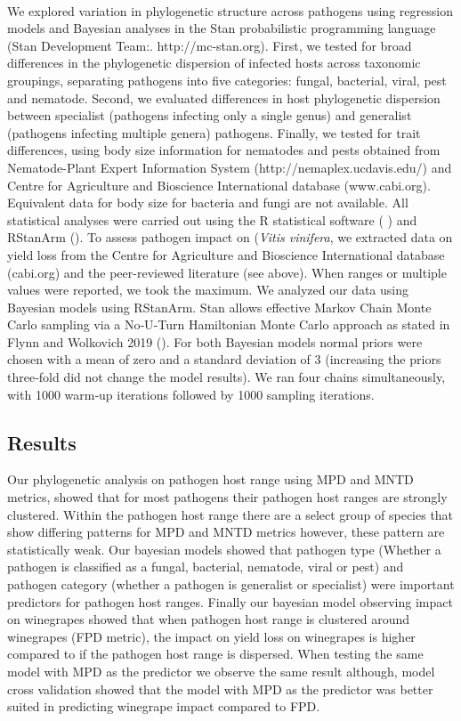 \documentclass{article}
\begin{document}
\paragraph{}We explored variation in phylogenetic structure across pathogens using regression models and Bayesian analyses in the Stan probabilistic programming language (Stan Development Team:. http://mc-stan.org). First, we tested for broad differences in the phylogenetic dispersion of infected hosts across taxonomic groupings, separating pathogens into five categories: fungal, bacterial, viral, pest and nematode. Second, we evaluated differences in host phylogenetic dispersion between specialist (pathogens infecting only a single genus) and generalist (pathogens infecting multiple genera) pathogens. Finally, we tested for trait differences, using body size information for nematodes and pests obtained from Nematode-Plant Expert Information System (http://nemaplex.ucdavis.edu/) and Centre for Agriculture and Bioscience International database (www.cabi.org). Equivalent data for body size for bacteria and fungi are not available. All statistical analyses were carried out using the R statistical software (\citep{R}
) and RStanArm (\citep{RSTANARM}). To assess pathogen impact on (\textit{Vitis vinifera}, we extracted data on yield loss from the Centre for Agriculture and Bioscience International database (cabi.org) and the peer-reviewed literature (see above). When ranges or multiple values were reported, we took the maximum. We analyzed our data using Bayesian models using RStanArm. Stan allows effective Markov Chain Monte Carlo sampling via a No‐U‐Turn Hamiltonian Monte Carlo approach as stated in Flynn and Wolkovich 2019 (\citep{Flynn2018a}). For both Bayesian models normal priors were chosen with a mean of zero and a standard deviation of 3 (increasing the priors three‐fold did not change the model results). We ran four chains simultaneously, with 1000 warm‐up iterations followed by 1000 sampling iterations.


\subsection{Results}
Our phylogenetic analysis on pathogen host range using MPD and MNTD metrics, showed that for most pathogens their pathogen host ranges are strongly clustered. Within the pathogen host range there are a select group of species that show differing patterns for MPD and MNTD metrics however, these pattern are statistically weak. Our bayesian models showed that pathogen type (Whether a pathogen is classified as a fungal, bacterial, nematode, viral or pest) and pathogen category (whether a pathogen is generalist or specialist) were important predictors for pathogen host ranges. Finally our bayesian model observing impact on winegrapes showed that when pathogen host range is clustered around winegrapes (FPD metric), the impact on yield loss on winegrapes is higher compared to if the pathogen host range is dispersed. When testing the same model with MPD as the predictor we observe the same result although, model cross validation showed that the model with MPD as the predictor was better suited in predicting winegrape impact compared to FPD.
\end{document}
